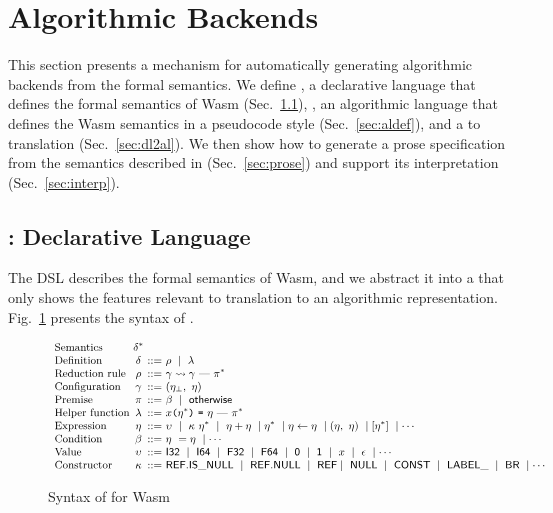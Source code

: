 \section{Algorithmic Backends}\label{sec:al}
This section presents a mechanism for automatically generating
algorithmic backends from the formal semantics.
We define \emph{\dl}, a declarative language that defines the formal
semantics of Wasm (Sec.~\ref{sec:dl}),
\emph{\al}, an algorithmic language that defines the Wasm semantics
in a pseudocode style (Sec.~\ref{sec:aldef}),
and a \dl to \al translation (Sec.~\ref{sec:dl2al}).
We then show how to generate a prose specification from the semantics
described in \al (Sec.~\ref{sec:prose}) and
support its interpretation (Sec.~\ref{sec:interp}).

\subsection{\dl: Declarative Language}\label{sec:dl}
The DSL describes the formal semantics of Wasm, and
we abstract it into a \dl that only shows the features relevant to translation to an algorithmic representation.
Fig.~\ref{fig:dl-syntax} presents the syntax of \dl.

\begin{figure}[t]
\[
\small
\begin{array}{l@{~}c@{~}r@{~}l}
\text{Semantics} & \delta^*\\
\text{Definition} & \delta &::=& \rho\ \mid\ \lambda\\
\text{Reduction rule} & \rho &::=& \gamma \leadsto \gamma\ \mbox{---}\ \pi^*\\
\text{Configuration} & \gamma &::=&(\eta_\bot,\ \eta)\\
\text{Premise} & \pi &::=& \beta\ \mid\ \mathsf{\small otherwise}\\
\text{Helper function} &
\lambda &::=& \varx \kwrl \eta^* \kwrr\ \kwequ\ \eta\ \mbox{---}\ \pi^*\\
\text{Expression} & \eta &::=& \upsilon\ \mid\ \kappa\ \eta^*\ \mid\ \eta + \eta\
\mid \eta^*\ \mid \eta \leftarrow \eta \ \mid (\eta,\ \eta)\ \mid [\eta^*]\
\mid \cdots \\
\text{Condition} & \beta  &::=& \eta\ = \eta\ \mid \cdots\\
\text{Value} & \upsilon &::=& \ssf{I32}\ \mid\ \ssf{I64}\ \mid\ 
\ssf{F32}\ \mid\ \ssf{F64}\ \mid\ 
\ssf{0}\ \mid\ \ssf{1}\ \mid\ x\ \mid\ \epsilon\ \mid \cdots \\
\text{Constructor} & \kappa &::=& \ssf{REF.IS\_NULL}\ \mid\ \ssf{REF.NULL}\
\mid\ \ssf{REF} \mid\ \ssf{NULL}\ \mid\ \ssf{CONST}\ \mid\ \ssf{LABEL\_}\
\mid\ \ssf{BR}\
\mid \cdots
\end{array}
\]
\caption{Syntax of \dl for Wasm}\label{fig:dl-syntax}
\end{figure}

